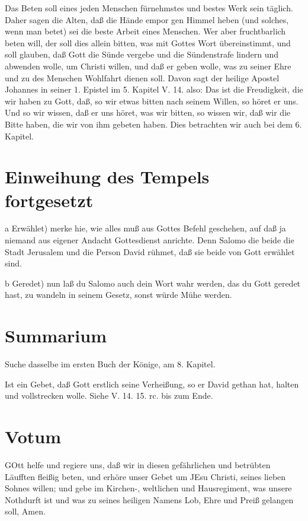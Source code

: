 Das Beten soll eines jeden Menschen fürnehmstes und bestes Werk sein täglich. Daher sagen die Alten, daß die Hände empor gen Himmel heben (und solches, wenn man betet) sei die beste Arbeit eines Menschen. Wer aber fruchtbarlich beten will, der soll dies allein bitten, was mit Gottes Wort übereinstimmt, und soll glauben, daß Gott die Sünde vergebe und die Sündenstrafe lindern und abwenden wolle, um Christi willen, und daß er geben wolle, was zu seiner Ehre und zu des Menschen Wohlfahrt dienen soll. Davon sagt der heilige Apostel Johannes in seiner 1. Epistel im 5. Kapitel V. 14. also: Das ist die Freudigkeit, die wir haben zu Gott, daß, so wir etwas bitten nach seinem Willen, so höret er uns. Und so wir wissen, daß er uns höret, was wir bitten, so wissen wir, daß wir die Bitte haben, die wir von ihm gebeten haben. Dies betrachten wir auch bei dem 6. Kapitel.

\section[Einweihung des Tempels fortgesetzt]{Einweihung des Tempels fortgesetzt}

a Erwählet) merke hie, wie alles muß aus Gottes Befehl geschehen, auf daß ja niemand aus eigener Andacht Gottesdienst anrichte. Denn Salomo die beide die Stadt Jerusalem und die Person David rühmet, daß sie beide von Gott erwählet sind.

b Geredet) nun laß du Salomo auch dein Wort wahr werden, das du Gott geredet hast, zu wandeln in seinem Gesetz, sonst würde Mühe werden.


\section{Summarium}

Suche dasselbe im ersten Buch der Könige, am 8. Kapitel.

Ist ein Gebet, daß Gott erstlich seine Verheißung, so er David gethan hat, halten und vollstrecken wolle. Siehe V. 14. 15. rc. bis zum Ende.

\section{Votum}

GOtt helfe und regiere uns, daß wir in diesen gefährlichen und betrübten Läufften fleißig beten, und erhöre unser Gebet um JEsu Christi, seines lieben Sohnes willen; und gebe im Kirchen-, weltlichen und Hausregiment, was unsere Nothdurft ist und was zu seines heiligen Namens Lob, Ehre und Preiß gelangen soll, Amen.

